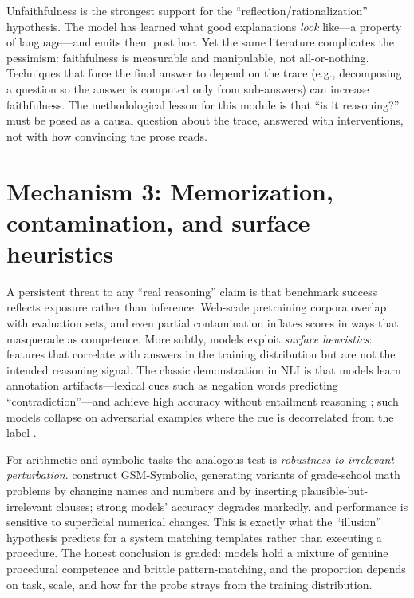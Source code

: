 \documentclass[11pt]{article}
\begin{document}
Unfaithfulness is the strongest support for the ``reflection/rationalization'' hypothesis. The model has learned what good explanations \emph{look} like---a property of language---and emits them post hoc. Yet the same literature complicates the pessimism: faithfulness is measurable and manipulable, not all-or-nothing. Techniques that force the final answer to depend on the trace (e.g., decomposing a question so the answer is computed only from sub-answers) can increase faithfulness. The methodological lesson for this module is that ``is it reasoning?'' must be posed as a causal question about the trace, answered with interventions, not with how convincing the prose reads.

\section{Mechanism 3: Memorization, contamination, and surface heuristics}
A persistent threat to any ``real reasoning'' claim is that benchmark success reflects exposure rather than inference. Web-scale pretraining corpora overlap with evaluation sets, and even partial contamination inflates scores in ways that masquerade as competence. More subtly, models exploit \emph{surface heuristics}: features that correlate with answers in the training distribution but are not the intended reasoning signal. The classic demonstration in NLI is that models learn annotation artifacts---lexical cues such as negation words predicting ``contradiction''---and achieve high accuracy without entailment reasoning \citep{gururangan2018annotation}; such models collapse on adversarial examples where the cue is decorrelated from the label \citep{mccoy2019right}.

For arithmetic and symbolic tasks the analogous test is \emph{robustness to irrelevant perturbation}. \citet{mirzadeh2024gsm} construct GSM-Symbolic, generating variants of grade-school math problems by changing names and numbers and by inserting plausible-but-irrelevant clauses; strong models' accuracy degrades markedly, and performance is sensitive to superficial numerical changes. This is exactly what the ``illusion'' hypothesis predicts for a system matching templates rather than executing a procedure. The honest conclusion is graded: models hold a mixture of genuine procedural competence and brittle pattern-matching, and the proportion depends on task, scale, and how far the probe strays from the training distribution.
\end{document}

